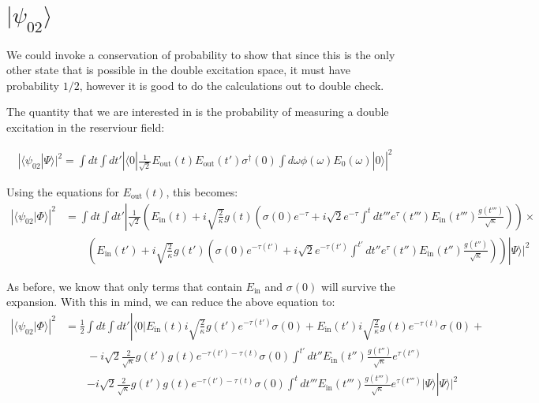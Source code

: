 \documentclass[12pt]{article}
\begin{document}
\section{$| \psi_{02} \rangle $}

We could invoke a conservation of probability to show that since this is the only other state that is possible in the double excitation space, it must have probability $1/2$, however it is good to do the calculations out to double check.

The quantity that we are interested in is the probability of measuring a double excitation in the reserviour field:

\begin{align}
|\langle \psi_{02} | \Psi \rangle |^2 =\int dt \int dt' \left | \langle 0 |\frac{1}{\sqrt{2}} E_\textrm{out}(t) E_\textrm{out}(t') \sigma^\dagger(0) \int d \omega \phi(\omega) E_0(\omega) | 0 \rangle \right |^2
\end{align}

Using the equations for $E_\textrm{out}(t)$, this becomes:
\begin{align}
\left | \langle \psi_{02} | \Phi \rangle \right | ^2 & =\int dt \int dt'\left |  \frac{1}{\sqrt{2}}\left ( E_\textrm{in}(t) 
+ i \sqrt{\frac{2}{\kappa}} g(t)\left ( \sigma(0) e^{-\tau} +
i\sqrt{2} e^{-\tau} \int^t d t''' e^\tau(t''') E_\textrm{in}(t''') \frac{g(t''')}{\sqrt{\kappa}} \right ) \right) \right .\times \\
 &\qquad \left. \left (E_\textrm{in}(t') + i \sqrt{\frac{2}{\kappa}} g(t')\left( \sigma(0) e^{-\tau(t')} +
 i\sqrt{2} e^{-\tau(t')} \int^{t'} d t'' e^\tau(t'') E_\textrm{in}(t'') \frac{g(t'')}{\sqrt{\kappa}}\right ) \right ) \right | \Psi \rangle |^2
\end{align}

 
 As before, we know that only terms that contain $E_\textrm{in}$ and $\sigma(0)$ will survive the expansion. With this in 
 mind, we can reduce the above equation to:
\begin{align}
 \left | \langle \psi_{02} | \Phi \rangle \right | ^2 & = \frac{1}{2}\int dt \int dt'\left |\langle 0 | E_\textrm{in}(t) i \sqrt{\frac{2}{\kappa}} g(t') e^{-\tau(t')}\sigma(0) + E_\textrm{in}(t') i \sqrt{\frac{2}{\kappa}} g(t) e^{-\tau(t)}\sigma(0) +\right.\\
&\qquad -i\sqrt{2}\frac{2}{\sqrt{\kappa}}g(t')g(t) e^{-\tau(t')-\tau(t)}\sigma(0) \int ^{t'} dt'' E_\textrm{in}(t'')\frac{g(t'')}{\sqrt{\kappa}} e^{\tau(t'')}\\
&\qquad \left. -i\sqrt{2}\frac{2}{\sqrt{\kappa}}g(t')g(t) e^{-\tau(t')-\tau(t)}\sigma(0) \int ^t dt''' E_\textrm{in}(t''')\frac{g(t''')}{\sqrt{\kappa}} e^{\tau(t''')}| \Psi \rangle\right| \Psi \rangle |^2
 \end{align}
 
\end{document}
